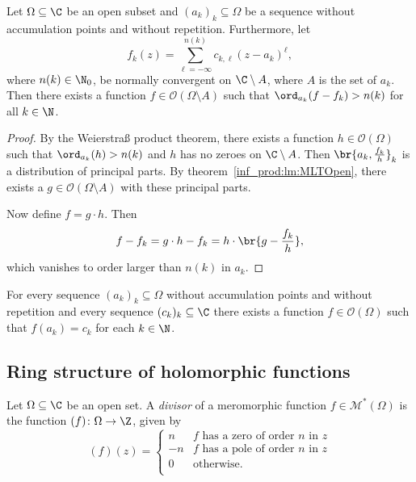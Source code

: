 \begin{izrek}
\label{inf_prod:thm:MLOsculation}
Let $\Omega \subseteq \C$ be an open subset and
$(a_k)_k \subseteq \Omega$ be a sequence without accumulation
points and without repetition. Furthermore, let
\[
f_k(z) =
\sum_{\ell=-\infty}^{n(k)} c_{k, \ell}(z - a_k)^\ell,
\]
where $n(k) \in \N_0$, be normally convergent on $\C \setminus A$,
where $A$ is the set of $a_k$. Then there exists a function
$f \in \mathcal{O}(\Omega \setminus A)$ such that
$\ord_{a_k}(f - f_k) > n(k)$ for all $k \in \N$.
\end{izrek}

\begin{proof}
By the Weierstraß product theorem, there exists a function
$h \in \mathcal{O}(\Omega)$ such that $\ord_{a_k}(h) > n(k)$ and
$h$ has no zeroes on $\C \setminus A$. Then
$\br{a_k, \frac{f_k}{h}}_k$ is a distribution of principal parts.
By theorem~\ref{inf_prod:lm:MLTOpen}, there exists a
$g \in \mathcal{O}(\Omega \setminus A)$ with these principal parts.

Now define $f = g \cdot h$. Then
\[
f - f_k = g \cdot h - f_k = h \cdot \br{g - \frac{f_k}{h}},
\]
which vanishes to order larger than $n(k)$ in $a_k$.
\end{proof}

\begin{posledica}
For every sequence $(a_k)_k \subseteq \Omega$ without accumulation
points and without repetition and every sequence
$(c_k)_k \subseteq \C$ there exists a function
$f \in \mathcal{O}(\Omega)$ such that $f(a_k) = c_k$ for each
$k \in \N$.
\end{posledica}

\newpage

\subsection{Ring structure of holomorphic functions}

\begin{definicija}
Let $\Omega \subseteq \C$ be an open set. A
\emph{divisor} of a meromorphic function
$f \in \mathcal{M}^*(\Omega)$ is the function
$(f) \colon \Omega \to \Z$, given by
\[
(f)(z) = \begin{cases}
 n & \text{$f$ has a zero of order $n$ in $z$} \\
-n & \text{$f$ has a pole of order $n$ in $z$} \\
 0 & \text{otherwise}.                         \\
\end{cases}
\]
\end{definicija}

